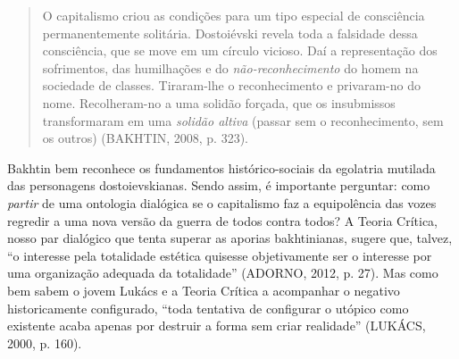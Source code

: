 \begin{quote}
O capitalismo criou as condições para um tipo especial de consciência
permanentemente solitária. Dostoiévski revela toda a falsidade dessa
consciência, que se move em um círculo vicioso. Daí a representação dos
sofrimentos, das humilhações e do \emph{não-reconhecimento} do homem na
sociedade de classes. Tiraram-lhe o reconhecimento e privaram-no do
nome. Recolheram-no a uma solidão forçada, que os insubmissos
transformaram em uma \emph{solidão altiva} (passar sem o reconhecimento,
sem os outros) (BAKHTIN, 2008, p. 323).
\end{quote}

Bakhtin bem reconhece os fundamentos histórico-sociais da egolatria
mutilada das personagens dostoievskianas. Sendo assim, é importante
perguntar: como \emph{partir} de uma ontologia dialógica se o
capitalismo faz a equipolência das vozes regredir a uma nova versão da
guerra de todos contra todos? A Teoria Crítica, nosso par dialógico que
tenta superar as aporias bakhtinianas, sugere que, talvez, ``o interesse
pela totalidade estética quisesse objetivamente ser o interesse por uma
organização adequada da totalidade'' (ADORNO, 2012, p. 27). Mas como bem
sabem o jovem Lukács e a Teoria Crítica a acompanhar o negativo
historicamente configurado, ``toda tentativa de configurar o utópico
como existente acaba apenas por destruir a forma sem criar realidade''
(LUKÁCS, 2000, p. 160).

